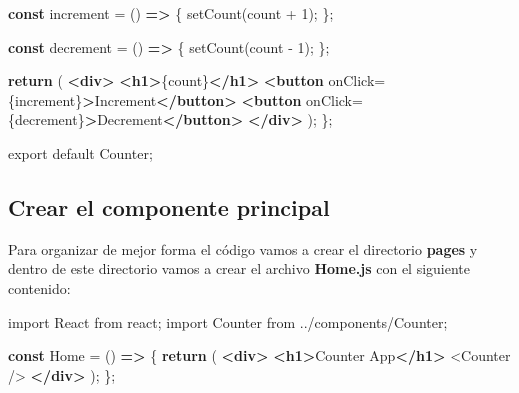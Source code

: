 \documentclass[
  a4paper,
  DIV=11,
  numbers=noendperiod,
  onepage,
  openany]{scrreprt}
\newenvironment{Shaded}{\begin{snugshade}}{\end{snugshade}}
\newcommand{\ControlFlowTok}[1]{\textcolor[rgb]{0.00,0.23,0.31}{\textbf{#1}}}
\newcommand{\DecValTok}[1]{\textcolor[rgb]{0.68,0.00,0.00}{#1}}
\newcommand{\FunctionTok}[1]{\textcolor[rgb]{0.28,0.35,0.67}{#1}}
\newcommand{\ImportTok}[1]{\textcolor[rgb]{0.00,0.46,0.62}{#1}}
\newcommand{\KeywordTok}[1]{\textcolor[rgb]{0.00,0.23,0.31}{\textbf{#1}}}
\newcommand{\NormalTok}[1]{\textcolor[rgb]{0.00,0.23,0.31}{#1}}
\newcommand{\OperatorTok}[1]{\textcolor[rgb]{0.37,0.37,0.37}{#1}}
\newcommand{\OtherTok}[1]{\textcolor[rgb]{0.00,0.23,0.31}{#1}}
\newcommand{\StringTok}[1]{\textcolor[rgb]{0.13,0.47,0.30}{#1}}
\newcommand{\VariableTok}[1]{\textcolor[rgb]{0.07,0.07,0.07}{#1}}
\begin{document}
\begin{tcolorbox}
\begin{Shaded}
\begin{Highlighting}[]
  \KeywordTok{const}\NormalTok{ increment }\OperatorTok{=}\NormalTok{ () }\KeywordTok{=\textgreater{}}\NormalTok{ \{}
    \FunctionTok{setCount}\NormalTok{(count }\OperatorTok{+} \DecValTok{1}\NormalTok{)}\OperatorTok{;}
\NormalTok{  \}}\OperatorTok{;}

  \KeywordTok{const}\NormalTok{ decrement }\OperatorTok{=}\NormalTok{ () }\KeywordTok{=\textgreater{}}\NormalTok{ \{}
    \FunctionTok{setCount}\NormalTok{(count }\OperatorTok{{-}} \DecValTok{1}\NormalTok{)}\OperatorTok{;}
\NormalTok{  \}}\OperatorTok{;}

  \ControlFlowTok{return}\NormalTok{ (}
    \KeywordTok{\textless{}div\textgreater{}}
      \KeywordTok{\textless{}h1\textgreater{}}\VariableTok{\{}\NormalTok{count}\VariableTok{\}}\KeywordTok{\textless{}/h1\textgreater{}}
      \KeywordTok{\textless{}button} \OtherTok{onClick}\OperatorTok{=}\VariableTok{\{}\NormalTok{increment}\VariableTok{\}}\KeywordTok{\textgreater{}}\NormalTok{Increment}\KeywordTok{\textless{}/button\textgreater{}}
      \KeywordTok{\textless{}button} \OtherTok{onClick}\OperatorTok{=}\VariableTok{\{}\NormalTok{decrement}\VariableTok{\}}\KeywordTok{\textgreater{}}\NormalTok{Decrement}\KeywordTok{\textless{}/button\textgreater{}}
    \KeywordTok{\textless{}/div\textgreater{}}
\NormalTok{  )}\OperatorTok{;}
\NormalTok{\}}\OperatorTok{;}

\ImportTok{export} \ImportTok{default}\NormalTok{ Counter}\OperatorTok{;}
\end{Highlighting}
\end{Shaded}

\subsection{Crear el componente
principal}\label{crear-el-componente-principal}

Para organizar de mejor forma el código vamos a crear el directorio
\textbf{pages} y dentro de este directorio vamos a crear el archivo
\textbf{Home.js} con el siguiente contenido:

\begin{Shaded}
\begin{Highlighting}[]
\ImportTok{import}\NormalTok{ React }\ImportTok{from} \StringTok{\textquotesingle{}react\textquotesingle{}}\OperatorTok{;}
\ImportTok{import}\NormalTok{ Counter }\ImportTok{from} \StringTok{\textquotesingle{}../components/Counter\textquotesingle{}}\OperatorTok{;}

\KeywordTok{const}\NormalTok{ Home }\OperatorTok{=}\NormalTok{ () }\KeywordTok{=\textgreater{}}\NormalTok{ \{}
  \ControlFlowTok{return}\NormalTok{ (}
    \KeywordTok{\textless{}div\textgreater{}}
      \KeywordTok{\textless{}h1\textgreater{}}\NormalTok{Counter App}\KeywordTok{\textless{}/h1\textgreater{}}
      \FunctionTok{\textless{}Counter} \FunctionTok{/\textgreater{}}
    \KeywordTok{\textless{}/div\textgreater{}}
\NormalTok{  )}\OperatorTok{;}
\NormalTok{\}}\OperatorTok{;}


\end{Highlighting}
\end{Shaded}
\end{tcolorbox}
\end{document}

